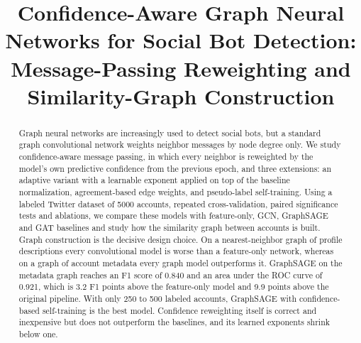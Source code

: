 \documentclass[conference,a4paper]{IEEEtran}
\begin{document}
\title{\fontsize{20}{24}\selectfont Confidence-Aware Graph Neural Networks for Social Bot Detection: Message-Passing Reweighting and Similarity-Graph Construction}

\author{
\and
{}
}

\maketitle

\begin{abstract}
Graph neural networks are increasingly used to detect social bots, but a standard graph convolutional network weights neighbor messages by node degree only. We study confidence-aware message passing, in which every neighbor is reweighted by the model's own predictive confidence from the previous epoch, and three extensions: an adaptive variant with a learnable exponent applied on top of the baseline normalization, agreement-based edge weights, and pseudo-label self-training. Using a labeled Twitter dataset of 5000 accounts, repeated cross-validation, paired significance tests and ablations, we compare these models with feature-only, GCN, GraphSAGE and GAT baselines and study how the similarity graph between accounts is built. Graph construction is the decisive design choice. On a nearest-neighbor graph of profile descriptions every convolutional model is worse than a feature-only network, whereas on a graph of account metadata every graph model outperforms it. GraphSAGE on the metadata graph reaches an F1 score of 0.840 and an area under the ROC curve of 0.921, which is 3.2 F1 points above the feature-only model and 9.9 points above the original pipeline. With only 250 to 500 labeled accounts, GraphSAGE with confidence-based self-training is the best model. Confidence reweighting itself is correct and inexpensive but does not outperform the baselines, and its learned exponents shrink below one.
\end{abstract}
\end{document}
